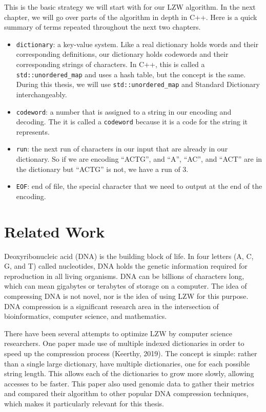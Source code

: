 \documentclass[12pt,twoside]{reedthesis}
\providecommand{\tightlist}{%
  \setlength{\itemsep}{0pt}\setlength{\parskip}{0pt}}
\begin{document}
This is the basic strategy we will start with for our LZW algorithm. In the next chapter, we will go over parts of the algorithm in depth in C++. Here is a quick summary of terms repeated throughout the next two chapters.
\begin{itemize}
\tightlist
\item
  \texttt{dictionary}: a key-value system. Like a real dictionary holds words and their corresponding definitions, our dictionary holds codewords and their corresponding strings of characters. In C++, this is called a \texttt{std::unordered\_map} and uses a hash table, but the concept is the same. During this thesis, we will use \texttt{std::unordered\_map} and Standard Dictionary interchangeably.
\item
  \texttt{codeword}: a number that is assigned to a string in our encoding and decoding. The it is called a \texttt{codeword} because it is a code for the string it represents.
\item
  \texttt{run}: the next run of characters in our input that are already in our dictionary. So if we are encoding ``ACTG'', and ``A'', ``AC'', and ``ACT'' are in the dictionary but ``ACTG'' is not, we have a run of 3.
\item
  \texttt{EOF}: end of file, the special character that we need to output at the end of the encoding.
\end{itemize}
\hypertarget{related-work}{%
\section{Related Work}\label{related-work}}

Deoxyribonucleic acid (DNA) is the building block of life. In four letters (A, C, G, and T) called nucleotides, DNA holds the genetic information required for reproduction in all living organisms. DNA can be billions of characters long, which can mean gigabytes or terabytes of storage on a computer.
The idea of compressing DNA is not novel, nor is the idea of using LZW for this purpose. DNA compression is a significant research area in the intersection of bioinformatics, computer science, and mathematics.

There have been several attempts to optimize LZW by computer science researchers. One paper made use of multiple indexed dictionaries in order to speed up the compression process (Keerthy, 2019). The concept is simple: rather than a single large dictionary, have multiple dictionaries, one for each possible string length. This allows each of the dictionaries to grow more slowly, allowing accesses to be faster. This paper also used genomic data to gather their metrics and compared their algorithm to other popular DNA compression techniques, which makes it particularly relevant for this thesis.
\end{document}
